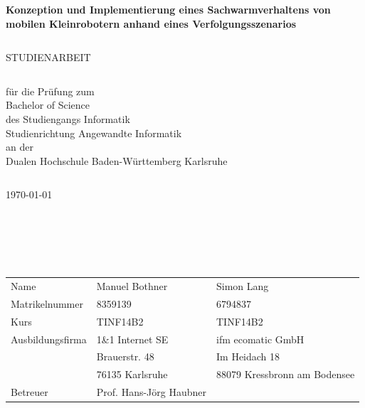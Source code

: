\pagestyle{scrheadings}
\clearscrheadfoot
{}
\begin{verbatim}
\end{verbatim}
\begin{center}
	\large{\textbf{Konzeption und Implementierung eines Sachwarmverhaltens von mobilen Kleinrobotern anhand eines Verfolgungsszenarios}}
\end{center}
\begin{verbatim}

\end{verbatim}
\begin{center}
	\large{STUDIENARBEIT}
\end{center}
\begin{verbatim}

\end{verbatim}
\begin{center}
	für die Prüfung zum\\
	\medskip
	Bachelor of Science\\
	\medskip
	des Studiengangs Informatik\\
	Studienrichtung Angewandte Informatik\\
	\medskip
	an der\\
	\medskip
	Dualen Hochschule Baden-Württemberg Karlsruhe\\
\end{center}
\begin{verbatim}
\end{verbatim}
\begin{center}
	\today
\end{center}
\begin{verbatim}





\end{verbatim}	
\begin{flushleft}
	\begin{tabular}{p{4cm} p{6cm} p{6cm}}
		Name & Manuel Bothner & Simon Lang\\
		Matrikelnummer & 8359139 & 6794837\\
		Kurs & TINF14B2 & TINF14B2\\
		Ausbildungsfirma & 1\&1 Internet SE & ifm ecomatic GmbH\\
		& Brauerstr. 48 & Im Heidach 18\\
		& 76135 Karlsruhe & 88079 Kressbronn am Bodensee\\
		Betreuer & Prof. Hans-Jörg Haubner & \\
	\end{tabular}
\end{flushleft}
